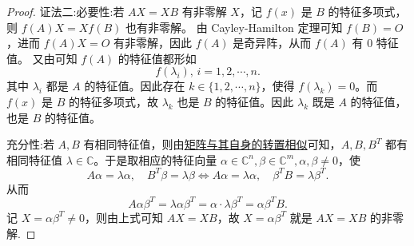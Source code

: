 \documentclass[../../main.tex]{subfiles}%
\begin{document}
\begin{proof}
{\color{blue} 证法二:}{\heiti 必要性:}若 \( AX = XB \) 有非零解 \( X \)，记 \( f(x) \) 是 \( B \) 的特征多项式，则 \( f(A)X = Xf(B) \) 也有非零解。  
由 Cayley-Hamilton 定理可知 \( f(B) = O \)，进而 \( f(A)X = O \) 有非零解，因此 \( f(A) \) 是奇异阵，从而 \( f(A) \) 有 \( 0 \) 特征值。  
又由可知 \( f(A) \) 的特征值都形如  
\[ f(\lambda_i), \, i = 1,2,\cdots,n. \]  
其中 \( \lambda_i \) 都是 \( A \) 的特征值。因此存在 \( k \in \{1,2,\cdots,n\} \)，使得 \( f(\lambda_k) = 0 \)。而 \( f(x) \) 是 \( B \) 的特征多项式，故 \( \lambda_k \) 也是 \( B \) 的特征值。因此 \( \lambda_k \) 既是 \( A \) 的特征值，也是 \( B \) 的特征值。  

{\heiti 充分性:}若 \( A,B \) 有相同特征值，则由\hyperref[proposition:lambda-矩阵一定与其转置相似]{矩阵与其自身的转置相似}可知，\( A,B,B^T \) 都有相同特征值 \( \lambda \in \mathbb{C} \)。于是取相应的特征向量 \( \alpha \in \mathbb{C}^n, \beta \in \mathbb{C}^m, \alpha,\beta \ne 0 \)，使  
\[ A\alpha = \lambda \alpha, \quad B^T\beta = \lambda \beta \Longleftrightarrow A\alpha = \lambda \alpha, \quad \beta^TB = \lambda \beta^T. \]  
从而  
\[ A\alpha\beta^T = \lambda \alpha\beta^T = \alpha \cdot \lambda \beta^T = \alpha\beta^TB. \]  
记 \( X = \alpha\beta^T \ne 0 \)，则由上式可知 \( AX = XB \)，故 \( X = \alpha\beta^T \) 就是 \( AX = XB \) 的非零解. 

\end{proof}
\end{document}
